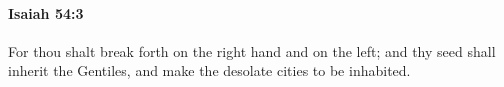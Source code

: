 
		\paragraph{Isaiah 54:3} %
			\label{ISAIAH-54-3}

			For thou shalt break forth on the right hand and on the left; and thy seed shall inherit the Gentiles, and make the desolate cities to be inhabited.


